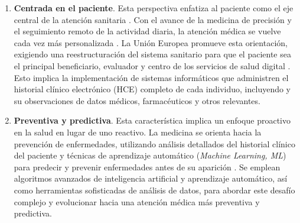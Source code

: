\begin{enumerate}


\item \textbf{Centrada en el paciente}. Esta perspectiva enfatiza al paciente como el eje central de la atención sanitaria \cite{tortorella2020healthcare}. Con el avance de la medicina de precisión y el seguimiento remoto de la actividad diaria, la atención médica se vuelve cada vez más personalizada \cite{ruiz2023inteligencia}. La Unión Europea promueve esta orientación, exigiendo una reestructuración del sistema sanitario para que el paciente sea el principal beneficiario, evaluador y centro de los servicios de salud digital \cite{ntafi2022legal, katehakis2019framework}. Esto implica la implementación de sistemas informáticos que administren el historial clínico electrónico (HCE) completo de cada individuo, incluyendo y su observaciones de datos médicos, farmacéuticos y otros relevantes.




\item \textbf{Preventiva y predictiva}. Esta característica implica un enfoque proactivo en la salud en lugar de uno reactivo. La medicina se orienta hacia la prevención de enfermedades, utilizando análisis detallados del historial clínico del paciente y técnicas de aprendizaje automático (\textit{Machine Learning, ML}) para predecir y prevenir enfermedades antes de su aparición \cite{ruiz2023inteligencia}. Se emplean algoritmos avanzados de inteligencia artificial y aprendizaje automático, así como herramientas sofisticadas de análisis de datos, para abordar este desafío complejo y evolucionar hacia una atención médica más preventiva y predictiva.


\end{enumerate}
